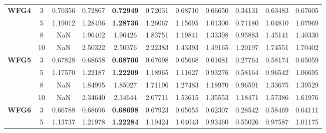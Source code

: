 \documentclass[conference]{IEEEtran}
\begin{document}
\begin{table*}[!htb]
\begin{tabular}{|c|c|c|c|c|c|c|c|c|c|c|}
		\multirow{4}{*}{\textbf{WFG4}}  & 3          & 0.70356          & 0.72867           & \textbf{0.72949}      & 0.72031          & 0.68710             & 0.66650             & 0.34131            & 0.63483              & 0.67605          \\ \cline{2-11} 
		& 5          & 1.19012          & 1.28496           & \textbf{1.28736}      & 1.26067          & 1.15695             & 1.01300             & 0.71180            & 1.04810              & 1.07969          \\ \cline{2-11} 
		& 8          & NaN              & 1.96402           & 1.96426               & 1.83751          & 1.19841             & 1.33398             & 0.95883            & 1.45141              & 1.40330          \\ \cline{2-11} 
		& 10         & NaN              & 2.50322           & 2.50376               & 2.22383          & 1.43393             & 1.49165             & 1.20197            & 1.74551              & 1.70402          \\ \hline
		\multirow{4}{*}{\textbf{WFG5}}  & 3          & 0.67828          & 0.68658           & \textbf{0.68706}      & 0.67698          & 0.65668             & 0.61681             & 0.27764            & 0.58174              & 0.65059          \\ \cline{2-11} 
		& 5          & 1.17570          & 1.22187           & \textbf{1.22209}      & 1.18965          & 1.11627             & 0.93276             & 0.58164            & 0.96542              & 1.06695          \\ \cline{2-11} 
		& 8          & NaN              & 1.84995           & 1.85027               & 1.71196          & 1.27483             & 1.18970             & 0.96591            & 1.33675              & 1.39529          \\ \cline{2-11} 
		& 10         & NaN              & 2.34640           & 2.34644               & 2.07711          & 1.53615             & 1.35553             & 1.18471            & 1.57386              & 1.61976          \\ \hline
		\multirow{4}{*}{\textbf{WFG6}}  & 3          & 0.66788          & 0.68696           & \textbf{0.68698}      & 0.67923          & 0.65655             & 0.62307             & 0.28542            & 0.58469              & 0.64111          \\ \cline{2-11} 
		& 5          & 1.13737          & 1.21978           & \textbf{1.22284}      & 1.19424          & 1.04043             & 0.93460             & 0.55026            & 0.97587              & 1.01175          \\ \cline{2-11} 

\end{tabular}
\end{table*}
\end{document}
